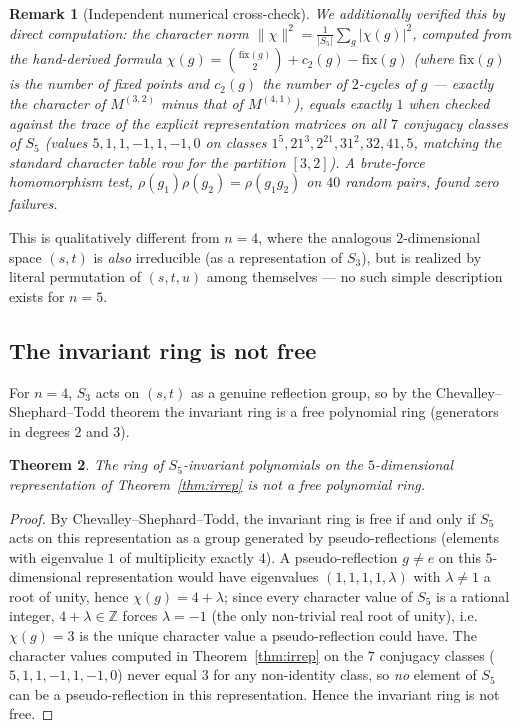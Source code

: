 \documentclass[reqno]{amsart}
\newtheorem{theorem}{Theorem}[section]
\newtheorem{remark}[theorem]{Remark}
\newcommand{\Z}{\mathbb{Z}}
\begin{document}
\begin{remark}[Independent numerical cross-check]
We additionally verified this by direct computation: the character norm
$\|\chi\|^2=\frac{1}{|S_5|}\sum_g|\chi(g)|^2$, computed from the hand-derived formula
$\chi(g)=\binom{\mathrm{fix}(g)}{2}+c_2(g)-\mathrm{fix}(g)$ (where $\mathrm{fix}(g)$ is the number
of fixed points and $c_2(g)$ the number of $2$-cycles of $g$ --- exactly the character of
$M^{(3,2)}$ minus that of $M^{(4,1)}$), equals exactly $1$ when checked against the trace of the
explicit representation matrices on all $7$ conjugacy classes of $S_5$ (values
$5,1,1,-1,1,-1,0$ on classes $1^5,21^3,2^21,31^2,32,41,5$, matching the standard character table
row for the partition $[3,2]$). A brute-force homomorphism test, $\rho(g_1)\rho(g_2)=\rho(g_1g_2)$
on $40$ random pairs, found zero failures.
\end{remark}

This is qualitatively different from $n=4$, where the analogous $2$-dimensional space $(s,t)$ is
\emph{also} irreducible (as a representation of $S_3$), but is realized by literal permutation of
$(s,t,u)$ among themselves --- no such simple description exists for $n=5$.

\subsection{The invariant ring is not free}

For $n=4$, $S_3$ acts on $(s,t)$ as a genuine reflection group, so by the
Chevalley--Shephard--Todd theorem the invariant ring is a free polynomial ring (generators in
degrees $2$ and $3$).

\begin{theorem}
\label{thm:notfree}
The ring of $S_5$-invariant polynomials on the $5$-dimensional representation of
Theorem~\ref{thm:irrep} is not a free polynomial ring.
\end{theorem}

\begin{proof}
By Chevalley--Shephard--Todd, the invariant ring is free if and only if $S_5$ acts on this
representation as a group generated by pseudo-reflections (elements with eigenvalue $1$ of
multiplicity exactly $4$). A pseudo-reflection $g\neq e$ on this $5$-dimensional representation
would have eigenvalues $(1,1,1,1,\lambda)$ with $\lambda\neq1$ a root of unity, hence
$\chi(g)=4+\lambda$; since every character value of $S_5$ is a rational integer, $4+\lambda\in\Z$
forces $\lambda=-1$ (the only non-trivial real root of unity), i.e.\ $\chi(g)=3$ is the unique
character value a pseudo-reflection could have. The character values computed in
Theorem~\ref{thm:irrep} on the $7$ conjugacy classes ($5,1,1,-1,1,-1,0$) never equal $3$ for any
non-identity class, so \emph{no} element of $S_5$ can be a pseudo-reflection in this
representation. Hence the invariant ring is not free.
\end{proof}
\end{document}
